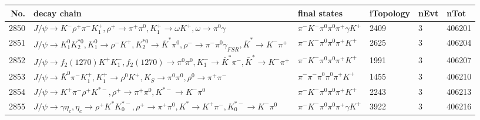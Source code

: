 \begin{table}[htbp] 
\begin{center}
\begin{small}
\begin{tabular}{rlllll}\hline\hline
 No. & decay chain & final states &  iTopology & nEvt & nTot \\\hline
2850&$J/\psi       \rightarrow K^{-}          \rho^{+}      \pi^{-}        K_1^{+}        , \rho^{+}       \rightarrow \pi^{+}        \pi^{0}        , K_1^{+}         \rightarrow \omega         K^{+}          , \omega          \rightarrow \pi^{0}        \gamma       $&$\pi^{-}        K^{-}          \pi^{0}        \pi^{0}        \pi^{+}        \gamma       K^{+}          $& 2409&    3&406201\\
2851&$J/\psi       \rightarrow K_1^{0}        K_2^{*0}       , K_1^{0}         \rightarrow \rho^{-}      K^{+}          , K_2^{*0}        \rightarrow \bar{K}^{*}   \pi^{0}        , \rho^{-}       \rightarrow \pi^{-}        \pi^{0}        \gamma_{FSR} , \bar{K}^{*}    \rightarrow K^{-}          \pi^{+}        $&$\pi^{-}        K^{-}          \pi^{0}        \pi^{0}        \pi^{+}        K^{+}          $& 2625&    3&406204\\
2852&$J/\psi       \rightarrow f_{2}(1270)    K^{+}          K_{1}^{-}      , f_{2}(1270)     \rightarrow \pi^{0}        \pi^{0}        , K_{1}^{-}       \rightarrow \bar{K}^{*}   \pi^{-}        , \bar{K}^{*}    \rightarrow K^{-}          \pi^{+}        $&$\pi^{-}        K^{-}          \pi^{0}        \pi^{0}        \pi^{+}        K^{+}          $& 1991&    3&406207\\
2853&$J/\psi       \rightarrow \bar{K}^{0}   \pi^{-}        K_1^{+}        , K_1^{+}         \rightarrow \rho^{0}      K^{+}          , K_{S}           \rightarrow \pi^{0}        \pi^{0}        , \rho^{0}       \rightarrow \pi^{+}        \pi^{-}        $&$\pi^{-}        \pi^{-}        \pi^{0}        \pi^{0}        \pi^{+}        K^{+}          $& 1455&    3&406210\\
2854&$J/\psi       \rightarrow K^{+}          \pi^{-}        \rho^{+}      K^{*-}         , \rho^{+}       \rightarrow \pi^{+}        \pi^{0}        , K^{*-}          \rightarrow K^{-}          \pi^{0}        $&$\pi^{-}        K^{-}          \pi^{0}        \pi^{0}        \pi^{+}        K^{+}          $& 2243&    3&406213\\
2855&$J/\psi       \rightarrow \gamma       \eta_{c}    , \eta_{c}     \rightarrow \rho^{+}      K^{*}          K_{0}^{*-}     , \rho^{+}       \rightarrow \pi^{+}        \pi^{0}        , K^{*}           \rightarrow K^{+}          \pi^{-}        , K_{0}^{*-}      \rightarrow K^{-}          \pi^{0}        $&$\pi^{-}        K^{-}          \pi^{0}        \pi^{0}        \pi^{+}        \gamma       K^{+}          $& 3922&    3&406216\\

\end{tabular}
\end{small}
\end{center}
\end{table}
